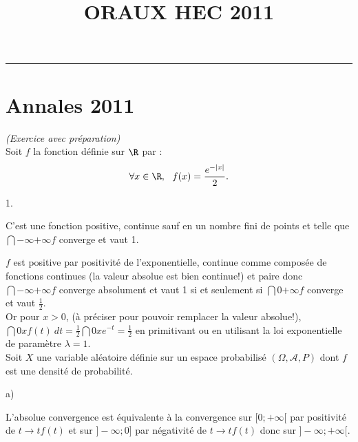 \documentclass[11pt]{article}%
\title{\bf \vspace{-1cm} ORAUX HEC 2011} %
\author{} %
\date{} %
\begin{document}
\maketitle %
\vspace{-1.2cm}\hrule %
\thispagestyle{fancy}

\vspace*{.4cm}


\section{Annales 2011}

\begin{exercice}{\it (Exercice avec préparation)}~\\
  Soit $f$ la fonction définie sur $\R$ par :
  \[
  \forall x \in \R,\ \ f(x) = \frac{e^{- | x |} }{2}.
  \]
  \begin{noliste}{1.}
    \setlength{\itemsep}{4mm}
  \item C'est une fonction positive, continue sauf en un nombre fini
    de points et telle que $\dint{-\infty}{+ \infty} f$ converge et
    vaut 1.
  \item $f$ est positive par positivité de l'exponentielle, continue
    comme composée de fonctions continues (la valeur absolue est bien
    continue!) et paire donc $\dint{-\infty}{+ \infty} f$ converge
    absolument et vaut 1 si et seulement si $\dint{0}{+ \infty} f$
    converge et vaut $\frac{1}{2}$. \\
    Or pour $x > 0$, (à préciser pour pouvoir remplacer la valeur
    absolue!), $\dint{0}{x} f(t)\ dt = \frac{1}{2} \dint{0}{x} e^{-t}
    = \frac{1}{2}$ en primitivant ou en utilisant la loi exponentielle
    de paramètre $\lambda = 1$.\\
    Soit $X$ une variable aléatoire définie sur un espace probabilisé
    $(\Omega, \mathcal{A}, P)$ dont $f$ est une densité de probabilité. \\
  \item 
    \begin{noliste}{a)} 
      \setlength{\itemsep}{2mm}
    \item L'absolue convergence est équivalente à la convergence sur
      $[0 ; + \infty[$ par positivité de $t \rightarrow t f(t)$ et sur
      $]-\infty ; 0]$ par négativité de $t \rightarrow t f(t)$ donc
      sur $]-\infty ; + \infty[$.\\

\end{noliste}
\end{noliste}
\end{exercice}
\end{document}
